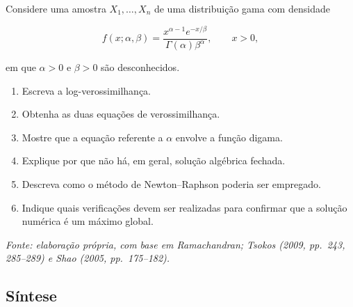 \documentclass[
  letterpaper,
  DIV=11,
  numbers=noendperiod]{scrreprt}
\providecommand{\tightlist}{%
  \setlength{\itemsep}{0pt}\setlength{\parskip}{0pt}}\usepackage{longtable,booktabs,array}
\begin{document}
\begin{tcolorbox}[enhanced jigsaw, colback=white, leftrule=.75mm, colbacktitle=quarto-callout-tip-color!10!white, breakable, titlerule=0mm, bottomtitle=1mm, title=\textcolor{quarto-callout-tip-color}{\faLightbulb}\hspace{0.5em}{Exercício 10 --- Otimização numérica}, colframe=quarto-callout-tip-color-frame, toprule=.15mm, opacityback=0, bottomrule=.15mm, opacitybacktitle=0.6, arc=.35mm, toptitle=1mm, rightrule=.15mm, coltitle=black, left=2mm]

Considere uma amostra \(X_1,\ldots,X_n\) de uma distribuição gama com
densidade

\[f(x;\alpha,\beta)
=
\frac{
x^{\alpha-1}e^{-x/\beta}
}{
\Gamma(\alpha)\beta^\alpha
},
\qquad x>0,\]

em que \(\alpha>0\) e \(\beta>0\) são desconhecidos.

\begin{enumerate}
\def\labelenumi{\arabic{enumi}.}
\tightlist
\item
  Escreva a log-verossimilhança.
\item
  Obtenha as duas equações de verossimilhança.
\item
  Mostre que a equação referente a \(\alpha\) envolve a função digama.
\item
  Explique por que não há, em geral, solução algébrica fechada.
\item
  Descreva como o método de Newton--Raphson poderia ser empregado.
\item
  Indique quais verificações devem ser realizadas para confirmar que a
  solução numérica é um máximo global.
\end{enumerate}

\emph{Fonte: elaboração própria, com base em Ramachandran; Tsokos (2009,
pp.~243, 285--289) e Shao (2005, pp.~175--182).}

\end{tcolorbox}

\subsection{Síntese}\label{suxedntese}
\end{document}
